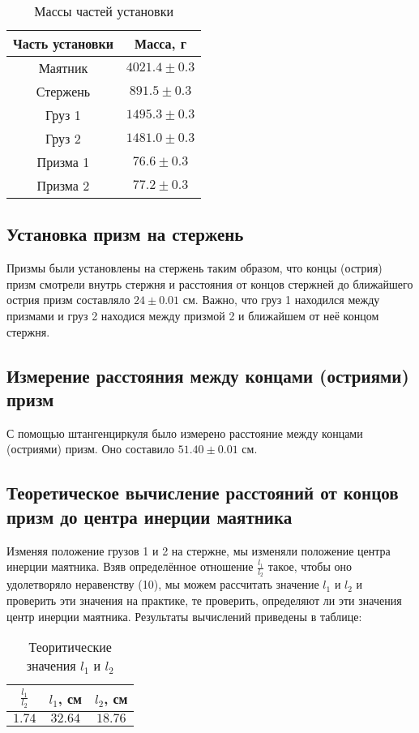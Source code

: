 \documentclass[a4paper]{article}
\begin{document}
\begin{table}[h!]
\centering
\caption{Массы частей установки}
\begin{tabular}{|c|c|}
\hline
Часть установки & Масса, г  \\ \hline
Маятник  & $4021.4\pm{0.3}$  \\ \hline
Стержень & $891.5 \pm{0.3}$  \\ \hline
Груз 1   & $1495.3\pm{0.3}$  \\ \hline
Груз 2   & $1481.0\pm{0.3}$  \\ \hline
Призма 1 & $76.6  \pm{0.3}$  \\ \hline
Призма 2 & $77.2  \pm{0.3}$  \\ \hline
\end{tabular}
\end{table}

\subsection{Установка призм на стержень}

Призмы были установлены на стержень таким образом, что концы (острия) призм смотрели внутрь стержня и расстояния от концов стержней до ближайшего острия призм составляло $24\pm{0.01}$ см. Важно, что груз 1 находился между призмами и груз 2 находися между призмой 2 и ближайшем от неё концом стержня.

\subsection{Измерение расстояния между концами (остриями) призм}

С помощью штангенциркуля было измерено расстояние между концами (остриями) призм. Оно составило $51.40\pm{0.01}$ см.

\subsection{Теоретическое вычисление расстояний от концов призм до центра инерции маятника}

Изменяя положение грузов 1 и 2 на стержне, мы изменяли положение центра инерции маятника. Взяв определённое отношение $\frac{l_1}{l_2}$ такое, чтобы оно удолетворяло неравенству (10), мы можем рассчитать значение $l_1$ и $l_2$ и проверить эти значения на практике, те проверить, определяют ли эти значения центр инерции маятника. Результаты вычислений приведены в таблице:

\begin{table}[h!]
\centering
\caption{Теоритические значения $l_1$ и $l_2$}
\begin{tabular}{|c|c|c|}
\hline
$\frac{l_1}{l_2}$ & $l_1$, см & $l_2$, см  \\ \hline
$1.74$  & $32.64$ & $18.76$  \\ \hline
\end{tabular}
\end{table}
\end{document}
